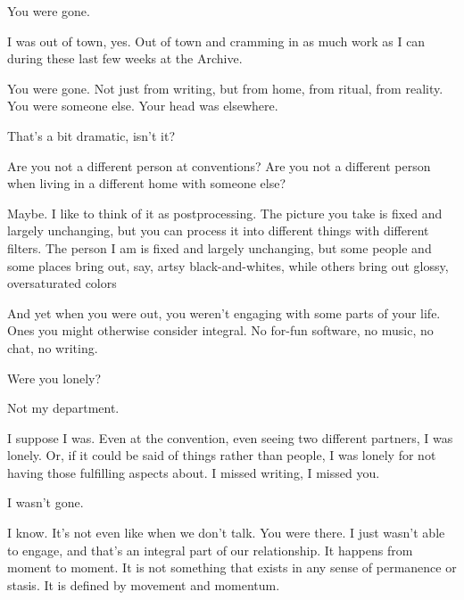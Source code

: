 \label{ally:25}
\begin{paracol}{2}
  \begin{leftcolumn}

\begin{ally}
You were gone.
\end{ally}
I was out of town, yes. Out of town and cramming in as much work as I can during these last few weeks at the Archive.

\begin{ally}
You were gone. Not just from writing, but from home, from ritual, from reality. You were someone else. Your head was elsewhere.
\end{ally}
That's a bit dramatic, isn't it?

\begin{ally}
Are you not a different person at conventions? Are you not a different person when living in a different home with someone else?
\end{ally}
Maybe. I like to think of it as postprocessing. The picture you take is fixed and largely unchanging, but you can process it into different things with different filters. The person I am is fixed and largely unchanging, but some people and some places bring out, say, artsy black-and-whites, while others bring out glossy, oversaturated colors

\begin{ally}
And yet when you were out, you weren't engaging with some parts of your life. Ones you might otherwise consider integral. No for-fun software, no music, no chat, no writing.
\end{ally}
Were you lonely?

\begin{ally}
Not my department.
\end{ally}
I suppose I was. Even at the convention, even seeing two different partners, I was lonely. Or, if it could be said of things rather than people, I was lonely for not having those fulfilling aspects about. I missed writing, I missed you.

\begin{ally}
I wasn't gone.
\end{ally}
I know. It's not even like when we don't talk. You were there. I just wasn't able to engage, and that's an integral part of our relationship. It happens from moment to moment. It is not something that exists in any sense of permanence or stasis. It is defined by movement and momentum.
\newpage
\end{leftcolumn}
\end{paracol}
